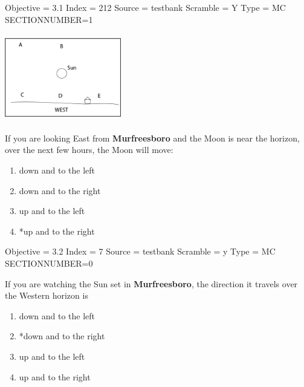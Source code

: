 \documentclass[11pt]{article}
\begin{document}
\begin{enumerate}
\begin{minipage}{\textwidth}
\begin{minipage}{3.0in}
Objective = 3.1
Index = 212
Source = testbank
Scramble = Y
Type = MC
SECTIONNUMBER=1
\end{minipage}
\hspace{0.5in}
\includegraphics[width=2in,height=1.5in,valign=c]{./images/sunset.png}
\end{minipage}
\vskip 0.20in

\begin{minipage}{\textwidth}
\begin{minipage}{\textwidth}
\item If you are looking East from {\bf Murfreesboro} and the Moon is near the horizon, over the next few hours, the Moon will move:
\begin{multicols}{2}
\begin{enumerate} 
\setlength{\itemsep}{1pt} 
\setlength{\parskip}{0pt} 
\setlength{\parsep}{0pt}
\setlength{\multicolsep}{1pt} 
\item down and to the left
\item down and to the right
\item up and to the left
\item *up and to the right
\end{enumerate} 
\vfill 
\end{multicols}

Objective = 3.2
Index = 7
Source = testbank
Scramble = y
Type = MC
SECTIONNUMBER=0
\end{minipage}
\end{minipage}
\vskip 0.20in

\begin{minipage}{\textwidth}
\begin{minipage}{\textwidth}
\item If you are watching the Sun set in {\bf Murfreesboro}, the direction it travels over the Western horizon is
\begin{multicols}{2}
\begin{enumerate} 
\setlength{\itemsep}{1pt} 
\setlength{\parskip}{0pt} 
\setlength{\parsep}{0pt}
\setlength{\multicolsep}{1pt} 
\item down and to the left
\item *down and to the right
\item up and to the left
\item up and to the right
\end{enumerate} 
\vfill 
\end{multicols}


\end{minipage}
\end{minipage}
\end{enumerate}
\end{document}
